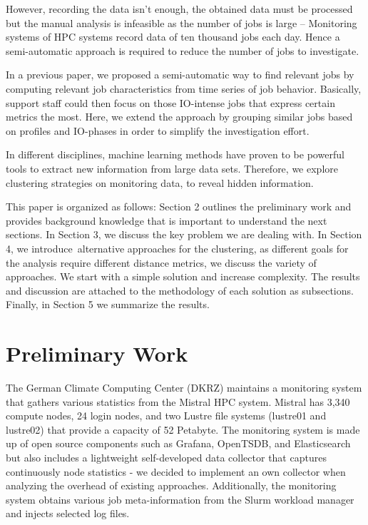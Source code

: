 \documentclass{jhps}
\begin{document}
However, recording the data isn't enough, the obtained data must be processed but the manual analysis is infeasible as the number of jobs is large -- Monitoring systems of HPC systems record data of ten thousand jobs each day.
Hence a semi-automatic approach is required to reduce the number of jobs to investigate.

In a previous paper, we proposed a semi-automatic way to find relevant jobs by computing relevant job characteristics from time series of job behavior.
Basically, support staff could then focus on those IO-intense jobs that express certain metrics the most.
Here, we extend the approach by grouping similar jobs based on profiles and IO-phases in order to simplify the investigation effort.

In different disciplines, machine learning methods have proven to be powerful tools to extract new information from large data sets.
Therefore, we explore clustering strategies on monitoring data, to reveal hidden information.

This paper is organized as follows: Section 2 outlines the preliminary work and provides background knowledge that is important to understand the next sections.
In Section 3, we discuss the key problem we are dealing with.
In Section 4, we introduce\ alternative approaches for the clustering, as different goals for the analysis require different distance metrics, we discuss the variety of approaches.
We start with a simple solution and increase complexity.
The results and discussion are attached to the methodology of each solution as subsections.
Finally, in Section 5 we summarize the results.


\section{Preliminary Work}
The German Climate Computing Center (DKRZ) maintains a monitoring system that gathers various statistics from the Mistral HPC system.
Mistral has 3,340 compute nodes, 24 login nodes, and two Lustre file systems (lustre01 and lustre02) that provide a capacity of 52 Petabyte.
The monitoring system is made up of open source components such as Grafana, OpenTSDB, and Elasticsearch but also includes a lightweight self-developed data collector that captures continuously node statistics - we decided to implement an own collector when analyzing the overhead of existing approaches.
Additionally, the monitoring system obtains various job meta-information from the Slurm workload manager and injects selected log files.
\end{document}
